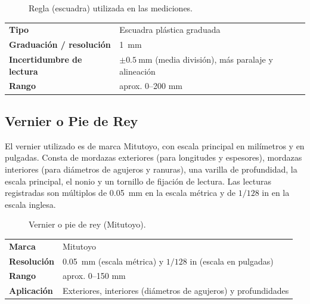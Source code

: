 \documentclass[12pt,a4paper]{article}
\begin{document}
\begin{figure}[H]
	\centering
	\caption{Regla (escuadra) utilizada en las mediciones.}
\end{figure}

\begin{table}[!htb]
	\centering
	\small
	\begin{tabularx}{\linewidth}{>{\bfseries}l X}
		Tipo                     & Escuadra plástica graduada
		\\
		Graduación / resolución  & \SI{1}{\milli\metre}
		\\
		Incertidumbre de lectura & $\pm\SI{0.5}{\milli\metre}$ (media división), más
		paralaje y alineación
		\\
		Rango                    & aprox. 0--200 mm
		\\
	\end{tabularx}
\end{table}

\subsection{Vernier o Pie de Rey}

El vernier utilizado es de marca Mitutoyo, con escala principal en milímetros y
en pulgadas. Consta de mordazas exteriores (para longitudes y espesores),
mordazas interiores (para diámetros de agujeros y ranuras), una
varilla de profundidad, la escala principal, el nonio y un tornillo de fijación
de lectura. Las lecturas registradas son múltiplos de \SI{0.05}{\milli\metre} en
la escala métrica y de $1/128$ in en la escala inglesa.

\begin{figure}[H]
	\centering
	\caption{Vernier o pie de rey (Mitutoyo).}
\end{figure}

\begin{table}[!htb]
	\centering
	\small
	\begin{tabularx}{\linewidth}{>{\bfseries}l X}
		Marca      & Mitutoyo
		\\
		Resolución & \SI{0.05}{\milli\metre} (escala métrica) y $1/128$ in (escala
		en pulgadas)
		\\
		Rango      & aprox. 0--150 mm
		\\
		Aplicación & Exteriores, interiores (diámetros de agujeros) y profundidades
		\\
	\end{tabularx}
\end{table}
\end{document}
